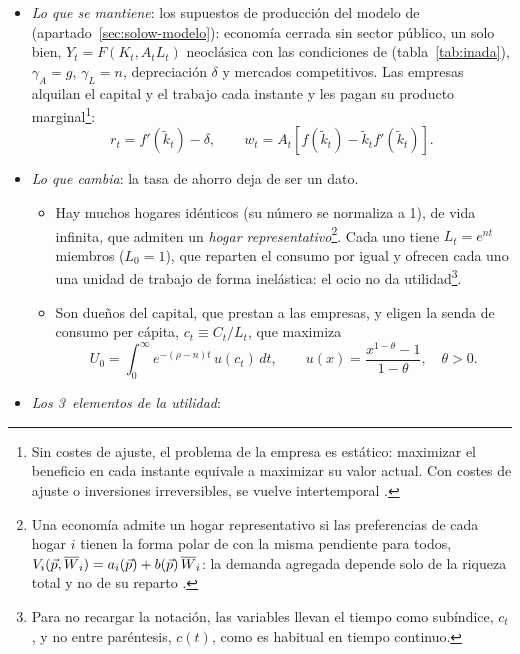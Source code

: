 \documentclass[11pt]{article}
\begin{document}
\begin{itemize}
\item \emph{Lo que se mantiene}: los supuestos de producción del modelo de  (apartado~\ref{sec:solow-modelo}): economía cerrada sin sector público, un solo bien, $Y_t=F(K_t,A_tL_t)$ neoclásica con las condiciones de  (tabla~\ref{tab:inada}), $\gamma_A=g$, $\gamma_L=n$, depreciación $\delta$ y mercados competitivos. Las empresas alquilan el capital y el trabajo cada instante y les pagan su producto marginal\footnote{Sin costes de ajuste, el problema de la empresa es estático: maximizar el beneficio en cada instante equivale a maximizar su valor actual. Con costes de ajuste o inversiones irreversibles, se vuelve intertemporal .}:
  \[r_t=f'(\tilde k_t)-\delta,\qquad w_t=A_t\left[f(\tilde k_t)-\tilde k_tf'(\tilde k_t)\right].\]
\item \emph{Lo que cambia}: la tasa de ahorro deja de ser un dato.
  \begin{itemize}
  \item Hay muchos hogares idénticos (su número se normaliza a 1), de vida infinita, que admiten un \emph{hogar representativo}\footnote{Una economía admite un hogar representativo si las preferencias de cada hogar $i$ tienen la forma polar de  con la misma pendiente para todos, $V_i(\vec{p},\overline W_i)=a_i(\vec{p})+b(\vec{p})\,\overline W_i$: la demanda agregada depende solo de la riqueza total y no de su reparto\nocite{Acemoglu2009} .}. Cada uno tiene $L_t=e^{nt}$ miembros ($L_0=1$), que reparten el consumo por igual y ofrecen cada uno una unidad de trabajo de forma inelástica: el ocio no da utilidad\footnote{Para no recargar la notación, las variables llevan el tiempo como subíndice, $c_t$, y no entre paréntesis, $c(t)$, como es habitual en tiempo continuo.}.
  \item Son dueños del capital, que prestan a las empresas, y eligen la senda de consumo per cápita, $c_t\equiv C_t/L_t$, que maximiza
    \begin{equation}
    U_0=\int_0^{\infty}e^{-(\rho-n)t}\,u(c_t)\,dt,\qquad u(x)=\frac{x^{1-\theta}-1}{1-\theta},\quad\theta>0.\label{eq:hogar-rck}
    \end{equation}
  \end{itemize}
\item \emph{Los 3~elementos de la utilidad}:
  \begin{itemize}

\end{itemize}
\end{itemize}
\end{document}
